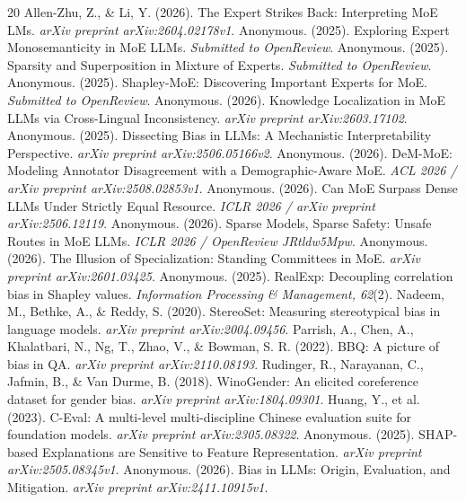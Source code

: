 \documentclass[11pt,a4paper]{article}
\begin{document}
\begin{thebibliography}{20}
 Allen-Zhu, Z., \& Li, Y. (2026). The Expert Strikes Back: Interpreting MoE LMs. \textit{arXiv preprint arXiv:2604.02178v1}.
 Anonymous. (2025). Exploring Expert Monosemanticity in MoE LLMs. \textit{Submitted to OpenReview}.
 Anonymous. (2025). Sparsity and Superposition in Mixture of Experts. \textit{Submitted to OpenReview}.
 Anonymous. (2025). Shapley-MoE: Discovering Important Experts for MoE. \textit{Submitted to OpenReview}.
 Anonymous. (2026). Knowledge Localization in MoE LLMs via Cross-Lingual Inconsistency. \textit{arXiv preprint arXiv:2603.17102}.
 Anonymous. (2025). Dissecting Bias in LLMs: A Mechanistic Interpretability Perspective. \textit{arXiv preprint arXiv:2506.05166v2}.
 Anonymous. (2026). DeM-MoE: Modeling Annotator Disagreement with a Demographic-Aware MoE. \textit{ACL 2026 / arXiv preprint arXiv:2508.02853v1}.
 Anonymous. (2026). Can MoE Surpass Dense LLMs Under Strictly Equal Resource. \textit{ICLR 2026 / arXiv preprint arXiv:2506.12119}.
 Anonymous. (2026). Sparse Models, Sparse Safety: Unsafe Routes in MoE LLMs. \textit{ICLR 2026 / OpenReview JRtldw5Mpw}.
 Anonymous. (2026). The Illusion of Specialization: Standing Committees in MoE. \textit{arXiv preprint arXiv:2601.03425}.
 Anonymous. (2025). RealExp: Decoupling correlation bias in Shapley values. \textit{Information Processing \& Management, 62}(2).
 Nadeem, M., Bethke, A., \& Reddy, S. (2020). StereoSet: Measuring stereotypical bias in language models. \textit{arXiv preprint arXiv:2004.09456}.
 Parrish, A., Chen, A., Khalatbari, N., Ng, T., Zhao, V., \& Bowman, S. R. (2022). BBQ: A picture of bias in QA. \textit{arXiv preprint arXiv:2110.08193}.
 Rudinger, R., Narayanan, C., Jafmin, B., \& Van Durme, B. (2018). WinoGender: An elicited coreference dataset for gender bias. \textit{arXiv preprint arXiv:1804.09301}.
 Huang, Y., et al. (2023). C-Eval: A multi-level multi-discipline Chinese evaluation suite for foundation models. \textit{arXiv preprint arXiv:2305.08322}.
 Anonymous. (2025). SHAP-based Explanations are Sensitive to Feature Representation. \textit{arXiv preprint arXiv:2505.08345v1}.
 Anonymous. (2026). Bias in LLMs: Origin, Evaluation, and Mitigation. \textit{arXiv preprint arXiv:2411.10915v1}.
\end{thebibliography}
\end{document}

